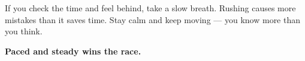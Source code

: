 {\begin{tcolorbox}[
    enhanced,
    colback=funYellowLight,
    colframe=funYellow!60,
    arc=10pt,
    boxrule=1pt,
    left=6mm, right=6mm, top=4mm, bottom=4mm,
]
\vspace{2mm}

If you check the time and feel behind, take a slow breath. Rushing causes more mistakes than it saves time. Stay calm and keep moving — you know more than you think.
\end{tcolorbox}

\vspace{4mm}

\begin{center}
{\large\bfseries\color{funTealDark} \faClock\hspace{2mm}Paced and steady wins the race.\hspace{2mm}\faClock}
\end{center}

}
\newpage

